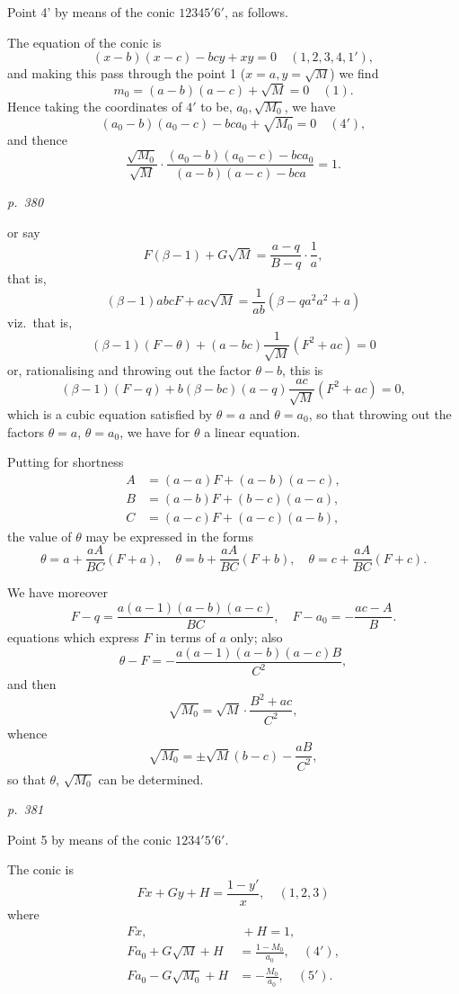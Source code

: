 \documentclass[11pt,a4paper]{article}
\theoremstyle{plain}
\theoremstyle{definition}
\begin{document}
Point 4' by means of the conic $123 4 5' 6'$, as follows.

The equation of the conic is
\[
(x - b)(x - c) - bc y + x y = 0\quad (1, 2, 3, 4, 1'),
\]
and making this pass through the point 1 ($x = a, y = \sqrt{M}$) we find
\[
m_0 = (a - b)(a - c) + \sqrt{M} = 0 \quad (1).
\]
Hence taking the coordinates of $4'$ to be, $a_0, \sqrt{M_0}$, we have
\[
(a_0 - b)(a_0 - c) - bc a_0 + \sqrt{M_0} = 0 \quad (4'),
\]
and thence
\[
\frac{\sqrt{M_0}}{\sqrt{M}} \cdot \frac{(a_0 - b)(a_0 - c) - bc a_0}{(a - b)(a - c) - bc a} = 1.
\]

\clearpage

\bigskip
\textit{p.~380}
\smallskip

\noindent
or say
\[
F(\beta - 1) + G \sqrt{M} = \frac{a - q}{B - q} \cdot \frac{1}{a},
\]
that is,
\[
(\beta - 1) abc F + a c \sqrt{M} = \frac{1}{a b}(\beta - q a^2 a^2 + a)
\]
viz.\ that is,
\[
(\beta - 1)(F - \theta) + (a - bc)\frac{1}{\sqrt{M}}(F^2 + a c) = 0
\]
or, rationalising and throwing out the factor $\theta - b$, this is
\[
(\beta - 1)(F - q) + b(\beta - bc)(a - q)\frac{a c}{\sqrt{M}}(F^2 + a c) = 0,
\]
which is a cubic equation satisfied by $\theta = a$ and $\theta = a_0$, so that throwing out the
factors $\theta = a$, $\theta = a_0$, we have for $\theta$ a linear equation.

Putting for shortness
\begin{align*}
A &= (a - a)F + (a - b)(a - c), \\
B &= (a - b)F + (b - c)(a - a), \\
C &= (a - c)F + (a - c)(a - b),
\end{align*}
the value of $\theta$ may be expressed in the forms
\[
\theta = a + \frac{a A}{B C}(F + a), \quad \theta = b + \frac{a A}{B C}(F + b), \quad \theta = c + \frac{a A}{B C}(F + c).
\]

We have moreover
\[
F - q = \frac{a(a - 1)(a - b)(a - c)}{B C}, \quad F - a_0 = -\frac{a c - A}{B}.
\]
equations which express $F$ in terms of $a$ only; also
\[
\theta - F = -\frac{a(a - 1)(a - b)(a - c) B}{C^2},
\]
and then
\[
\sqrt{M_0} = \sqrt{M} \cdot \frac{B^2 + a c}{C^2},
\]
whence
\[
\sqrt{M_0} = \pm \sqrt{M}(b - c) - \frac{a B}{C^2},
\]
so that $\theta$, $\sqrt{M_0}$ can be determined.

\clearpage

\bigskip
\textit{p.~381}
\smallskip

\noindent
Point 5 by means of the conic $1234'5'6'$.

The conic is
\[
Fx + Gy + H = \frac{1 - y'}{x}, \quad (1, 2, 3)
\]
where
\begin{align*}
Fx,\ &\ +H = 1, \\
Fa_0 + G \sqrt{M} + H &= \frac{1 - M_0}{a_0}, \quad (4'), \\
Fa_0 - G \sqrt{M_0} + H &= -\frac{M_0}{a_0}, \quad (5').
\end{align*}
\end{document}
